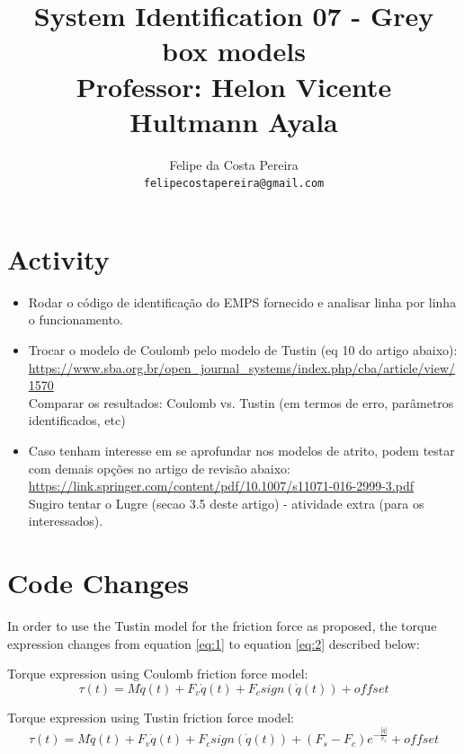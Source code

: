\documentclass[10pt, a4paper]{article}
\title{System Identification 07 - Grey box models \\ \large Professor: Helon Vicente Hultmann Ayala}
\author{Felipe da Costa Pereira \\ {\tt felipecostapereira@gmail.com}}
\begin{document}
\maketitle


\section{Activity}

\begin{itemize}
      \item
      Rodar o c{\'o}digo de identifica{\c c}{\~a}o do EMPS fornecido e analisar linha por linha o funcionamento.
      \item
      Trocar o modelo de Coulomb pelo modelo de Tustin (eq 10 do artigo abaixo): \\
      \url{https://www.sba.org.br/open_journal_systems/index.php/cba/article/view/1570} \\
      Comparar os resultados: Coulomb vs. Tustin (em termos de erro, par{\^a}metros identificados, etc)
      \item
      Caso tenham interesse em se aprofundar nos modelos de atrito, podem testar com demais op{\c c}{\~o}es no artigo de revis{\~a}o abaixo: \\
      \url{https://link.springer.com/content/pdf/10.1007/s11071-016-2999-3.pdf} \\
      Sugiro tentar o Lugre (secao 3.5 deste artigo) - atividade extra (para os interessados).
\end{itemize}

\section{Code Changes}

In order to use the Tustin model for the friction force as proposed, the torque expression changes from equation \ref{eq:1} to equation \ref{eq:2} described below:     \newline


Torque expression using Coulomb friction force model:
\begin{equation}\label{eq:1}
      \tau(t) = M\ddot{q}(t) + F_{v}\dot{q}(t) + F_{c}sign(\dot{q}(t)) + offset
\end{equation}

Torque expression using Tustin friction force model:
\begin{equation}\label{eq:2}
      \tau(t) = M\ddot{q}(t) + F_{v}\dot{q}(t) + F_{c}sign(\dot{q}(t)) + (F_{s} - F_{c})e^{-\frac{|\dot{q}|}{v_{s}}} + offset
\end{equation}
\end{document}
